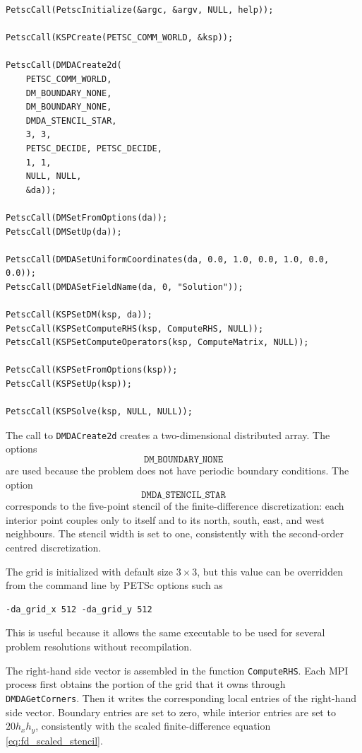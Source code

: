 \documentclass[unicode,10pt,a4paper,oneside,numbers=endperiod,openany]{scrartcl}
\begin{document}
\begin{lstlisting}[style=grayverbatim, caption={Creation of the PETSc solver and distributed grid}, label={lst:petsc_setup}]
PetscCall(PetscInitialize(&argc, &argv, NULL, help));

PetscCall(KSPCreate(PETSC_COMM_WORLD, &ksp));

PetscCall(DMDACreate2d(
    PETSC_COMM_WORLD,
    DM_BOUNDARY_NONE,
    DM_BOUNDARY_NONE,
    DMDA_STENCIL_STAR,
    3, 3,
    PETSC_DECIDE, PETSC_DECIDE,
    1, 1,
    NULL, NULL,
    &da));

PetscCall(DMSetFromOptions(da));
PetscCall(DMSetUp(da));

PetscCall(DMDASetUniformCoordinates(da, 0.0, 1.0, 0.0, 1.0, 0.0, 0.0));
PetscCall(DMDASetFieldName(da, 0, "Solution"));

PetscCall(KSPSetDM(ksp, da));
PetscCall(KSPSetComputeRHS(ksp, ComputeRHS, NULL));
PetscCall(KSPSetComputeOperators(ksp, ComputeMatrix, NULL));

PetscCall(KSPSetFromOptions(ksp));
PetscCall(KSPSetUp(ksp));

PetscCall(KSPSolve(ksp, NULL, NULL));
\end{lstlisting}

The call to \texttt{DMDACreate2d} creates a two-dimensional distributed array.
The options
\[
    \texttt{DM\_BOUNDARY\_NONE}
\]
are used because the problem does not have periodic boundary conditions. The
option
\[
    \texttt{DMDA\_STENCIL\_STAR}
\]
corresponds to the five-point stencil of the finite-difference discretization:
each interior point couples only to itself and to its north, south, east, and
west neighbours. The stencil width is set to one, consistently with the
second-order centred discretization.

The grid is initialized with default size \(3 \times 3\), but this value can be
overridden from the command line by PETSc options such as
\begin{lstlisting}[style=grayverbatim, caption={Example of runtime grid-size selection}, label={lst:grid_options}]
-da_grid_x 512 -da_grid_y 512
\end{lstlisting}
This is useful because it allows the same executable to be used for several
problem resolutions without recompilation.

The right-hand side vector is assembled in the function \texttt{ComputeRHS}.
Each MPI process first obtains the portion of the grid that it owns through
\texttt{DMDAGetCorners}. Then it writes the corresponding local entries of the
right-hand side vector. Boundary entries are set to zero, while interior entries
are set to \(20 h_x h_y\), consistently with the scaled finite-difference
equation \eqref{eq:fd_scaled_stencil}.
\end{document}
